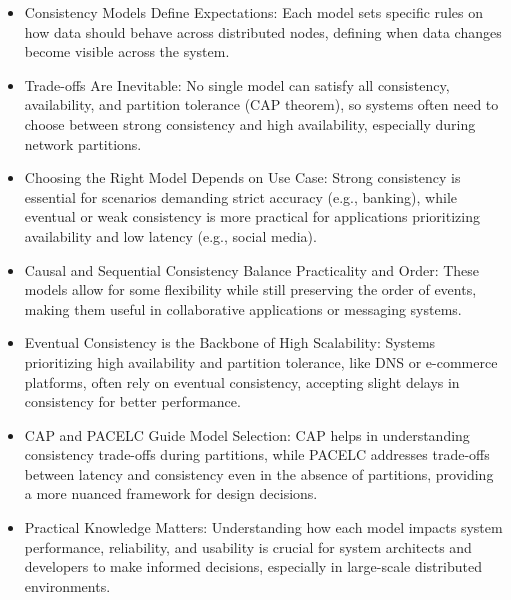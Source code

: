 \begin{itemize}
	\item Consistency Models Define Expectations: Each model sets specific rules on how data should
behave across distributed nodes, defining when data changes become visible across the
system.
	\item Trade-offs Are Inevitable: No single model can satisfy all consistency, availability, and partition
tolerance (CAP theorem), so systems often need to choose between strong consistency and
high availability, especially during network partitions.
	\item Choosing the Right Model Depends on Use Case: Strong consistency is essential for
scenarios demanding strict accuracy (e.g., banking), while eventual or weak consistency is more
practical for applications prioritizing availability and low latency (e.g., social media).
	\item Causal and Sequential Consistency Balance Practicality and Order: These models allow for
some flexibility while still preserving the order of events, making them useful in collaborative
applications or messaging systems.
	\item Eventual Consistency is the Backbone of High Scalability: Systems prioritizing high availability
and partition tolerance, like DNS or e-commerce platforms, often rely on eventual consistency,
accepting slight delays in consistency for better performance.
	\item CAP and PACELC Guide Model Selection: CAP helps in understanding consistency trade-offs
during partitions, while PACELC addresses trade-offs between latency and consistency even in
the absence of partitions, providing a more nuanced framework for design decisions.
\item Practical Knowledge Matters: Understanding how each model impacts system performance,
reliability, and usability is crucial for system architects and developers to make informed
decisions, especially in large-scale distributed environments.
\end{itemize}